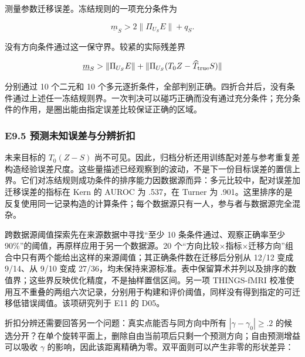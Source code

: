 \documentclass[11pt,a4paper]{article}
\begin{document}
\par
\noindent\begin{minipage}{\linewidth}

测量参数迁移误差。冻结规则的一项充分条件为

\[
\underline m_S>2\|\Pi_{U_S}E\|+q_S.
\]

\end{minipage}\par

\par
\noindent\begin{minipage}{\linewidth}

没有方向条件通过这一保守界。较紧的实际残差界

\[
\underline m_S>\|\Pi_{U_S}E\|
+\|\Pi_{U_S}(T_0Z-\widehat T_{\rm true}S)\|
\]

\end{minipage}\par

分别通过 10 个二元和 10
个多元逐折条件，全部判别正确。四折合并后，没有条件通过上述任一冻结规则界。一次判决可以碰巧正确而没有通过充分条件；充分条件的作用，是圈出能由指定误差比较保证正确的区域。

\subsubsection{E9.5
预测未知误差与分辨折扣}\label{e9.5-ux9884ux6d4bux672aux77e5ux8befux5deeux4e0eux5206ux8fa8ux6298ux6263}

未来目标的 \(T_0(Z-S)\)
尚不可见。因此，归档分析还用训练配对差与参考重复差构造经验误差尺度。这些量描述已经观察到的波动，不是下一份目标误差的置信上界。它们对冻结规则成功条件的排序能力因数据源而异：多元比较中，配对误差加迁移误差的指标在
Kern 的 AUROC 为 .537，在 Turner 为
.901。这里排序的是反复使用同一记录构造的计算条件；每个数据源只有一人，参与者与数据源完全混杂。

跨数据源阈值探索先在来源数据中寻找“至少 10 条条件通过、观察正确率至少
90\%”的阈值，再原样应用于另一个数据源。20
个“方向比较\(\times\)指标\(\times\)迁移方向”组合中只有两个能给出这样的来源阈值；其正确条件数在迁移后分别从
12/12 变成 9/14、从 9/10 变成
27/36，均未保持来源标准。表中保留算术并列以及排序的数值界；这些界反映优化精度，不是抽样置信区间。另一项
THINGS-fMRI
校准使用互不重叠的两组六次记录，分别用于构建和评价阈值，同样没有得到指定的可迁移低错误阈值。该项研究列于
E11 的 D05。

折扣分辨还需要回答另一个问题：真实点能否与同方向中所有
\(|\gamma-\gamma_0|\geq.2\)
的候选分开？在单个旋转平面上，删除自由当前项后只剩一个预测方向；自由预测增益可以吸收
\(\gamma\) 的影响，因此该距离精确为零。双平面则可以产生非零的形状差异：
\end{document}
